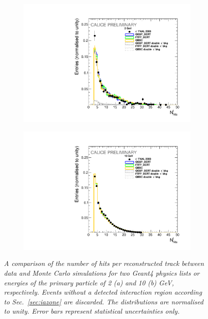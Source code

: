 \begin{figure}[H]
	\centering
	\begin{subfigure}{0.5\textwidth}
		\centering
		\includegraphics[width=.90\linewidth]{ECAL/plots/number-2.pdf}
		\caption{\label{fig:trh2} }
	\end{subfigure}%
	\begin{subfigure}{0.5\textwidth}
		\centering
		\includegraphics[width=.90\linewidth]{ECAL/plots/number-10.pdf}
		\caption{\label{fig:trh10} }
	\end{subfigure}
	\caption{\label{fig:trackhitsexample} \sl A comparison of the number of hits per reconstructed track between data and Monte Carlo simulations for two {\sc Geant}4 physics lists  or energies of the primary particle of 2 (a) and 10 (b) GeV, respectively. Events without a detected interaction region according to Sec.~\ref{sec:iazone} are discarded. The distributions are normalised to unity. Error bars represent statistical uncertainties only.}
\end{figure}

